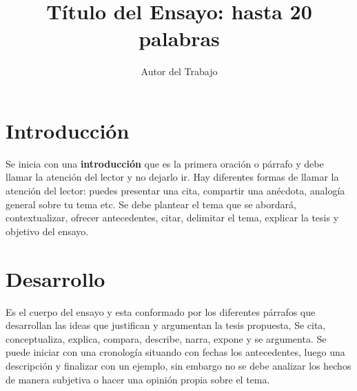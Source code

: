 \documentclass[runningheads]{llncs}
\begin{document}
\title{Título del Ensayo: hasta 20 palabras}
\author{
Autor del Trabajo  
}

\maketitle


\section{Introducción}

Se inicia con una \textbf{introducción}  que es la primera oración o párrafo  y debe llamar la atención del lector y no dejarlo ir. Hay diferentes formas de llamar la atención del lector: puedes presentar una cita,  compartir una anécdota, analogía general sobre tu tema etc. Se debe plantear el tema que se abordará, contextualizar, ofrecer antecedentes, citar, delimitar el tema, explicar la tesis y objetivo del ensayo.

\section{Desarrollo}
Es el cuerpo del ensayo y esta conformado por los diferentes párrafos que desarrollan las ideas que justifican y argumentan la tesis propuesta, Se cita, conceptualiza, explica, compara, describe, narra, expone y se argumenta. Se puede iniciar con una cronología situando con fechas los antecedentes, luego una descripción y finalizar con un ejemplo, sin embargo no se debe analizar los hechos de manera subjetiva o hacer una opinión propia sobre el tema. 
\end{document}
